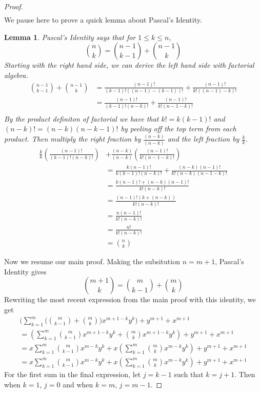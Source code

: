 \documentclass[11pt,reqno, tikz, border=3mm]{amsart}
\theoremstyle{plain}
\newtheorem{lemma}[theorem]{Lemma}
\theoremstyle{definition}
\theoremstyle{remark}
\begin{document}
\begin{proof}
\begin{align}
\end{align}
We pause here to prove a quick lemma about Pascal's Identity.
\begin{lemma}
Pascal's Identity says that for $1 \le k \le n$,
$$ \binom{n}{k} = \binom{n-1}{k-1} + \binom{n-1}{k}$$
Starting with the right hand side, we can derive the left hand side with factorial algebra.
\begin{align}
\binom{n-1}{k-1} + \binom{n-1}{k} &= \frac{(n-1)!}{(k-1)!((n-1)-(k-1))!} + \frac{(n-1)!}{k!((n-1)-k)!} \\
&= \frac{(n-1)!}{(k-1)!(n-k)!} + \frac{(n-1)!}{k!(n-1-k)!} \\
\end{align}
By the product definiton of factorial we have that $k! = k(k-1)!$ and $(n-k)! = (n-k)(n-k-1)!$ by peeling off the top term from each product. Then multiply the right fraction by $\frac{(n-k)}{(n-k)}$ and the left fraction by $\frac{k}{k}$.
\begin{align}
\frac{k}{k}\left(\frac{(n-1)!}{(k-1)!(n-k)!}\right)& + \frac{(n-k)}{(n-k)}\left(\frac{(n-1)!}{k!(n-1-k)!} \right) \\ 
&=\frac{k(n-1)!}{k(k-1)!(n-k)!} + \frac{(n-k)(n-1)!}{k!(n-k)(n-1-k)!} \\
&= \frac{k(n-1)! + (n-k)(n-1)!}{k!(n-k)!} \\
&= \frac{(n-1)!(k + (n-k))}{k!(n-k)!} \\
&= \frac{n(n-1)!}{k!(n-k)!} \\
&= \frac{n!}{k!(n-k)!} \\
&= \binom{n}{k}
\end{align}
\end{lemma}
Now we resume our main proof. Making the subsitution $n = m+1$, Pascal's Identity gives
$$\binom{m+1}{k} = \binom{m}{k-1} + \binom{m}{k}$$
Rewriting the most recent expression from the main proof with this identity, we get
\begin{align}
\Bigg(\sum^{m}_{k=1}\Bigg(\binom{m}{k-1} + \binom{m}{k}\Bigg) x^{m+1-k}y^k\Bigg) +y^{m+1}+ x^{m+1} \\
= \left( \sum^m_{k=1} \binom{m}{k-1}x^{m+1-k}y^k + \binom{m}{k}x^{m+1-k}y^k\right)  + y^{m+1} + x^{m+1} \\
= x\sum^m_{k=1}\binom{m}{k-1}x^{m-k}y^k + x\left(\sum^m_{k=1}\binom{m}{k}x^{m-k}y^k\right) + y^{m+1} + x^{m+1} \\
= x\sum^m_{k=1}\binom{m}{k-1}x^{m-k}y^k + x\left(\sum^m_{k=1}\binom{m}{k}x^{m-k}y^k \right)+ y^{m+1} + x^{m+1}
\end{align}
For the first sum in the final expression, let $j = k-1$ such that $k= j+1$. Then when $k=1$, $j=0$ and when $k=m$, $j=m-1$.

\end{proof}
\end{document}

